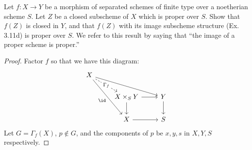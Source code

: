 \begin{exercise}
	Let $f: X \to Y$ be a morphism of separated schemes of finite type over a noetherian scheme $S$. Let $Z$ be a closed subscheme of $X$ which is proper over $S$. Show that $f(Z)$ is closed in $Y$, and that $f(Z)$ with its image subscheme structure (Ex. 3.11d) is proper over $S$. We refer to this result by saying that ``the image of a proper scheme is proper.'' 
	\fi
\end{exercise}
\begin{proof}
	Factor $f $ so that we have this diagram:
\[\begin{tikzcd}
	X \\
	& {X\times_S Y} & Y \\
	& X & S
	\arrow["\Gamma_f"{description},dashed, from=1-1, to=2-2]
	\arrow[from=1-1, to=2-3]
	\arrow["\id"',from=1-1, to=3-2]
	\arrow[from=2-2, to=2-3]
	\arrow[from=2-2, to=3-2]
	\arrow[from=2-3, to=3-3]
	\arrow[from=3-2, to=3-3]
\end{tikzcd}\]
	Let $G = \Gamma_f(X)$, $p \notin G $, and the components of $p $ be $x,y,s $ in $X,Y,S $ respectively.

\end{proof}

